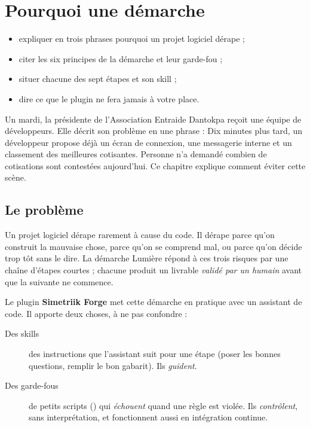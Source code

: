 \chapter{Pourquoi une démarche}\label{ch:demarche}

\begin{objectifs}[Objectifs]
\begin{itemize}
  \item expliquer en trois phrases pourquoi un projet logiciel dérape ;
  \item citer les six principes de la démarche et leur garde-fou ;
  \item situer chacune des sept étapes et son skill ;
  \item dire ce que le plugin ne fera jamais à votre place.
\end{itemize}
\end{objectifs}

\begin{situation}
Un mardi, la présidente de l'Association Entraide Dantokpa reçoit une équipe de développeurs.
Elle décrit son problème en une phrase :  Dix minutes plus tard, un développeur propose déjà un écran de connexion, une
messagerie interne et un classement des meilleures cotisantes. Personne n'a demandé combien de
cotisations sont contestées aujourd'hui. Ce chapitre explique comment éviter cette scène.
\end{situation}

\section{Le problème}
Un projet logiciel dérape rarement à cause du code. Il dérape parce qu'on construit la mauvaise
chose, parce qu'on se comprend mal, ou parce qu'on décide trop tôt sans le dire. La démarche
Lumière répond à ces trois risques par une chaîne d'étapes courtes ; chacune produit un
livrable \emph{validé par un humain} avant que la suivante ne commence.

Le plugin \textbf{Simetriik Forge} met cette démarche en pratique avec un assistant de code. Il
apporte deux choses, à ne pas confondre :
\begin{description}
  \item[Des skills] des instructions que l'assistant suit pour une étape (poser les bonnes questions, remplir le bon gabarit). Ils \emph{guident}.
  \item[Des garde-fous] de petits scripts () qui \emph{échouent} quand une règle est violée. Ils \emph{contrôlent}, sans interprétation, et fonctionnent aussi en intégration continue.
\end{description}

